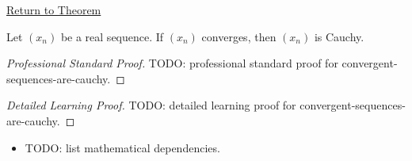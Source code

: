 \newpage
{}
\label{prf:convergent-sequences-are-cauchy}

\begin{remark*}[Return]
\hyperref[thm:convergent-sequences-are-cauchy]{Return to Theorem}
\end{remark*}

\begin{theorem*}
Let $(x_n)$ be a real sequence. If $(x_n)$ converges, then $(x_n)$ is
Cauchy.

\smallskip
\noindent
\end{theorem*}

\begin{proof}[Professional Standard Proof]
\LRAProofBodyStart
TODO: professional standard proof for convergent-sequences-are-cauchy.
\end{proof}

\begin{proof}[Detailed Learning Proof]
\LRAProofBodyStart
TODO: detailed learning proof for convergent-sequences-are-cauchy.
\end{proof}

\begin{remark*}
\end{remark*}

\begin{dependencies}
\begin{itemize}
  \item TODO: list mathematical dependencies.
\end{itemize}
\end{dependencies}

\clearpage
